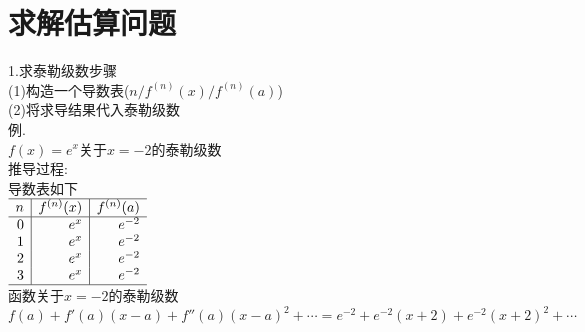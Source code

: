 \chapter{求解估算问题}
1.求泰勒级数步骤\\
(1)构造一个导数表($n/f^{(n)}(x)/f^{(n)}(a)$)\\
(2)将求导结果代入泰勒级数\\
例.\\
$f(x)=e^x$关于$x=-2$的泰勒级数\\
推导过程:\\
导数表如下\\[1ex]
$\begin{array}{r|r|r}
\hline
n & f^{(n)}(x) & f^{(n)}(a)\\
\hline
0 & e^x & e^{-2}\\
1 & e^x & e^{-2}\\
2 & e^x & e^{-2}\\
3 & e^x & e^{-2}\\
\hline
\end{array}$\\[1ex]
函数关于$x=-2$的泰勒级数\\
$\displaystyle f(a)+f'(a)(x-a)+f''(a)(x-a)^2+\cdots=e^{-2}+e^{-2}(x+2)+e^{-2}(x+2)^2+\cdots$\\[4ex]

